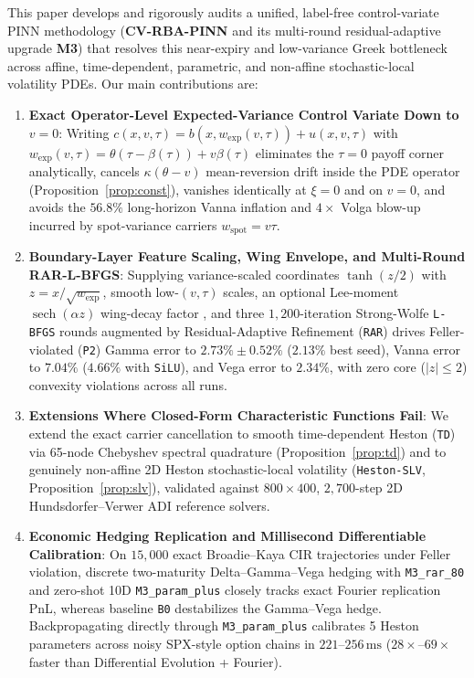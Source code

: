 \documentclass[11pt,a4paper]{article}
\begin{document}
This paper develops and rigorously audits a unified, label-free control-variate PINN methodology (\textbf{CV-RBA-PINN} and its multi-round residual-adaptive upgrade \textbf{M3}) that resolves this near-expiry and low-variance Greek bottleneck across affine, time-dependent, parametric, and non-affine stochastic-local volatility PDEs. Our main contributions are:
\begin{enumerate}
  \item \textbf{Exact Operator-Level Expected-Variance Control Variate Down to $v = 0$}: Writing $c(x,v,\tau) = b(x, w_{\mathrm{exp}}(v,\tau)) + u(x,v,\tau)$ with $w_{\mathrm{exp}}(v,\tau) = \theta(\tau - \beta(\tau)) + v\beta(\tau)$ eliminates the $\tau = 0$ payoff corner analytically, cancels $\kappa(\theta - v)$ mean-reversion drift inside the PDE operator (Proposition~\ref{prop:const}), vanishes identically at $\xi = 0$ and on $v = 0$, and avoids the $56.8\%$ long-horizon Vanna inflation and $4\times$ Volga blow-up incurred by spot-variance carriers $w_{\mathrm{spot}} = v\tau$.
  \item \textbf{Boundary-Layer Feature Scaling, Wing Envelope, and Multi-Round RAR-L-BFGS}: Supplying variance-scaled coordinates $\tanh(z/2)$ with $z = x/\sqrt{w_{\mathrm{exp}}}$, smooth low-$(v,\tau)$ scales, an optional Lee-moment $\operatorname{sech}(\alpha z)$ wing-decay factor \cite{lee2004moment}, and three $1{,}200$-iteration Strong-Wolfe \texttt{L-BFGS} rounds augmented by Residual-Adaptive Refinement (\texttt{RAR}) \cite{lu2021deepxde} drives Feller-violated (\texttt{P2}) Gamma error to $2.73\% \pm 0.52\%$ ($2.13\%$ best seed), Vanna error to $7.04\%$ ($4.66\%$ with \texttt{SiLU}), and Vega error to $2.34\%$, with zero core ($|z|\le 2$) convexity violations across all runs.
  \item \textbf{Extensions Where Closed-Form Characteristic Functions Fail}: We extend the exact carrier cancellation to smooth time-dependent Heston (\texttt{TD}) via 65-node Chebyshev spectral quadrature (Proposition~\ref{prop:td}) and to genuinely non-affine 2D Heston stochastic-local volatility (\texttt{Heston-SLV}, Proposition~\ref{prop:slv}), validated against $800\times 400$, $2{,}700$-step 2D Hundsdorfer--Verwer ADI reference solvers.
  \item \textbf{Economic Hedging Replication and Millisecond Differentiable Calibration}: On $15{,}000$ exact Broadie--Kaya CIR trajectories \cite{broadie2006exact} under Feller violation, discrete two-maturity Delta--Gamma--Vega hedging with \texttt{M3\_rar\_80} and zero-shot 10D \texttt{M3\_param\_plus} closely tracks exact Fourier replication PnL, whereas baseline \texttt{B0} destabilizes the Gamma--Vega hedge. Backpropagating directly through \texttt{M3\_param\_plus} calibrates 5 Heston parameters across noisy SPX-style option chains in $221\text{--}256\,\mathrm{ms}$ ($28\times\text{--}69\times$ faster than Differential Evolution + Fourier).
\end{enumerate}
\end{document}
